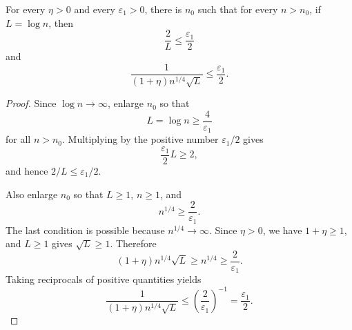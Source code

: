 \begin{helper}
For every \(\eta>0\) and every \(\varepsilon_1>0\), there is \(n_0\)
such that for every \(n>n_0\), if \(L=\log n\), then
\[
\frac{2}{L}\le\frac{\varepsilon_1}{2}
\]
and
\[
\frac{1}{(1+\eta)n^{1/4}\sqrt L}\le\frac{\varepsilon_1}{2}.
\]
\end{helper}
\begin{proof}
Since \(\log n\to\infty\), enlarge \(n_0\) so that
\[
L=\log n\ge \frac{4}{\varepsilon_1}
\]
for all \(n>n_0\).  Multiplying by the positive number
\(\varepsilon_1/2\) gives
\[
\frac{\varepsilon_1}{2}L\ge 2,
\]
and hence \(2/L\le \varepsilon_1/2\).

Also enlarge \(n_0\) so that \(L\ge 1\), \(n\ge 1\), and
\[
n^{1/4}\ge \frac{2}{\varepsilon_1}.
\]
The last condition is possible because \(n^{1/4}\to\infty\).  Since
\(\eta>0\), we have \(1+\eta\ge1\), and \(L\ge1\) gives
\(\sqrt L\ge1\).  Therefore
\[
(1+\eta)n^{1/4}\sqrt L\ge n^{1/4}\ge \frac{2}{\varepsilon_1}.
\]
Taking reciprocals of positive quantities yields
\[
\frac{1}{(1+\eta)n^{1/4}\sqrt L}
  \le \left(\frac{2}{\varepsilon_1}\right)^{-1}
  =\frac{\varepsilon_1}{2}.
\]
\end{proof}
